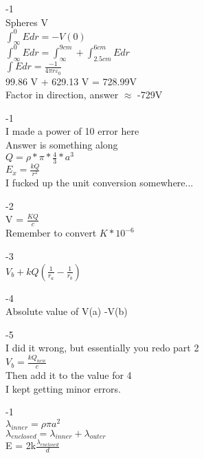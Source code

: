 \documentclass{article}
\begin{document}
-1 \\
Spheres V \\
$\int_{\infty}^{0} E dr = -V(0)$ \\
$\int_{\infty}^{0} E dr = \int_{\infty}^{9cm} + \int_{2.5cm}^{6cm} E dr $\\
$\int E dr = \frac{-1}{4 \pi r \varepsilon_0}$ \\
99.86 V + 629.13 V = 728.99V \\
Factor in direction, answer $\approx$ -729V


\vspace{2mm}

-1 \\
I made a power of 10 error here \\
Answer is something along  \\
$Q = \rho * \pi * \frac{4}{3} * a^3$ \\
$E_x = \frac{kQ}{r^2}$ \\
I fucked up the unit conversion somewhere...

\vspace{2mm}

-2 \\
V = $\frac{KQ}{c}$ \\
Remember to convert $K*10^{-6}$ 

\vspace{2mm}


-3 \\
$V_b + kQ(\frac{1}{r_a} - \frac{1}{r_b})$

\vspace{2mm}


-4 \\
Absolute value of V(a) -V(b) 

\vspace{2mm}


-5 \\
I did it wrong, but essentially you redo part 2\\
$V_b = \frac{kQ_{new}}{c}$ \\
Then add it to the value for 4 \\
I kept getting minor errors.

\vspace{2mm}

-1 \\
$\lambda_{inner} = \rho \pi a^2$ \\
$\lambda_{enclosed} = \lambda_{inner} + \lambda_{outer}$ \\
E = 2k$\frac{\lambda_{enclosed}}{d}$ 
\end{document}
